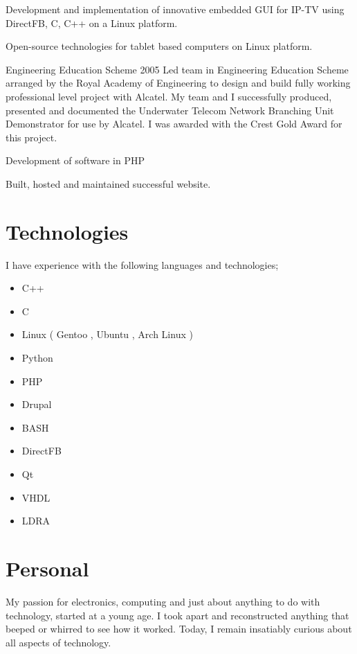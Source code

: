 \documentclass[overlapped,line,letterpaper]{res}
\begin{document}
\begin{resume}
{ 
    Development and implementation of innovative embedded GUI for IP-TV using 
    DirectFB, C, C++ on a Linux platform.
}

{ 
    Open-source technologies for tablet based computers on Linux platform. 
}

  {Engineering Education Scheme}
  {2005}
{
    Led team in Engineering Education Scheme arranged by the Royal Academy of
    Engineering to design and build fully working professional level project 
    with Alcatel.
    My team and I successfully produced, presented and documented the Underwater
    Telecom Network Branching Unit Demonstrator for use by Alcatel. 
    I was awarded with the Crest Gold Award for this project.
}

{ 
    Development of software in PHP 
} 

{ 
    Built, hosted and maintained successful website. 
}

\section{\bf{Technologies} }
I have experience with the following languages and technologies;
\begin{itemize}
 \item C++
 \item C
 \item Linux ( Gentoo , Ubuntu , Arch Linux )
 \item Python 
 \item PHP
 \item Drupal
 \item BASH
 \item DirectFB
 \item Qt
 \item VHDL
 \item LDRA
\end{itemize}

\newpage

\section{\bf{ Personal } }
My passion for electronics, computing and just about anything to do with 
technology, started at a young age. 
I took apart and reconstructed anything that beeped or whirred to see how it
worked. 
Today, I remain insatiably curious about all aspects of technology. 


\end{resume}
\end{document}
